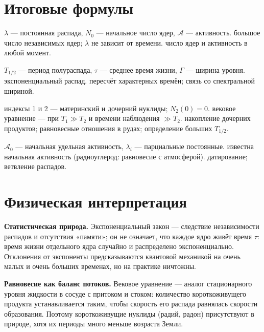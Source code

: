 \section{Итоговые формулы}

 {$\lambda$ — постоянная распада, $N_0$ — начальное число ядер, $\mathcal A$ — активность.}
 {большое число независимых ядер; $\lambda$ не зависит от времени.}
 {число ядер и активность в любой момент.}

 {$T_{1/2}$ — период полураспада, $\tau$ — среднее время жизни, $\Gamma$ — ширина уровня.}
 {экспоненциальный распад.}
 {пересчёт характерных времён; связь со спектральной шириной.}

 {индексы 1 и 2 — материнский и дочерний нуклиды; $N_2(0)=0$.}
 {вековое уравнение — при $T_1\gg T_2$ и времени наблюдения $\gg T_2$.}
 {накопление дочерних продуктов; равновесные отношения в рудах; определение больших $T_{1/2}$.}

 {$\mathcal A_0$ — начальная удельная активность, $\lambda_i$ — парциальные постоянные.}
 {известна начальная активность (радиоуглерод: равновесие с атмосферой).}
 {датирование; ветвление распадов.}

\section{Физическая интерпретация}

\textbf{Статистическая природа.} Экспоненциальный закон — следствие независимости распадов и отсутствия «памяти»;
он не означает, что каждое ядро живёт время $\tau$: время жизни отдельного ядра случайно и распределено
экспоненциально. Отклонения от экспоненты предсказываются квантовой механикой на очень малых и очень больших
временах, но на практике ничтожны.

\textbf{Равновесие как баланс потоков.} Вековое уравнение — аналог стационарного уровня жидкости в сосуде с притоком и
стоком: количество короткоживущего продукта устанавливается таким, чтобы скорость его распада равнялась скорости
образования. Поэтому короткоживущие нуклиды (радий, радон) присутствуют в природе, хотя их периоды много меньше
возраста Земли.

